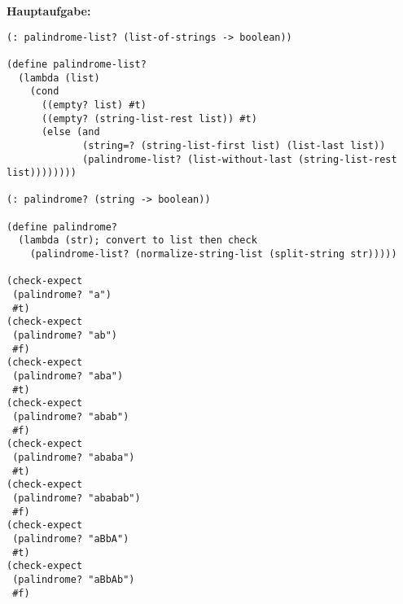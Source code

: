 \documentclass[a4paper,12pt]{article}
\begin{document}
\textbf{Hauptaufgabe:}

\begin{verbatim}
(: palindrome-list? (list-of-strings -> boolean))

(define palindrome-list?
  (lambda (list)
    (cond
      ((empty? list) #t)
      ((empty? (string-list-rest list)) #t)
      (else (and
             (string=? (string-list-first list) (list-last list))
             (palindrome-list? (list-without-last (string-list-rest list))))))))

(: palindrome? (string -> boolean))

(define palindrome?
  (lambda (str); convert to list then check
    (palindrome-list? (normalize-string-list (split-string str)))))

(check-expect
 (palindrome? "a")
 #t)
(check-expect
 (palindrome? "ab")
 #f)
(check-expect
 (palindrome? "aba")
 #t)
(check-expect
 (palindrome? "abab")
 #f)
(check-expect
 (palindrome? "ababa")
 #t)
(check-expect
 (palindrome? "ababab")
 #f)
(check-expect
 (palindrome? "aBbA")
 #t)
(check-expect
 (palindrome? "aBbAb")
 #f)
\end{verbatim}

\end{document}
